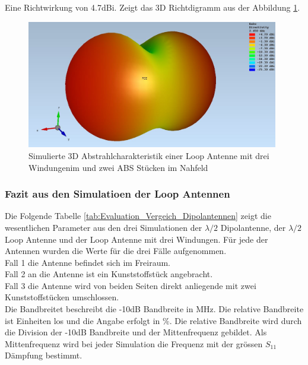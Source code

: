 Eine Richtwirkung von 4.7dBi. Zeigt das 3D Richtdigramm aus der Abbildung \ref{fig:sim_Loop_3Fach_2ABS_3D}.
\begin{figure}[h]
	\centering
	\includegraphics[width=11cm]{content/bilder/Evaluation/Loop/Kurz3/EMFraField_Loop_2ABS_kurz3.JPG}%
	\caption{Simulierte 3D Abstrahlcharakteristik einer Loop Antenne mit  drei Windungenim und zwei ABS Stücken im Nahfeld}
	\label{fig:sim_Loop_3Fach_2ABS_3D}
\end{figure}
\newpage
\subsubsection{Fazit aus den Simulatioen der Loop Antennen}
Die Folgende Tabelle \ref{tab:Evaluation_Vergeich_Dipolantennen} zeigt die wesentlichen Parameter aus den drei Simulationen der $\lambda/2$ Dipolantenne, der $\lambda/2$ Loop Antenne und der Loop Antenne mit drei Windungen. Für jede der Antennen wurden die Werte für die drei Fälle aufgenommen.\\
Fall 1 die Antenne befindet sich im Freiraum.\\
Fall 2 an die Antenne ist ein Kunststoffstück angebracht.\\
Fall 3 die Antenne wird von beiden Seiten direkt anliegende mit zwei Kunststoffstücken umschlossen.\\
Die Bandbreitet beschreibt die -10dB Bandbreite in MHz. Die relative Bandbreite ist Einheiten los und die Angabe erfolgt in $\%$. Die relative Bandbreite wird durch die Division der -10dB Bandbreite und der Mittenfrequenz gebildet. Als Mittenfrequenz wird bei jeder Simulation die Frequenz mit der grössen $S_{11}$ Dämpfung bestimmt.\\

